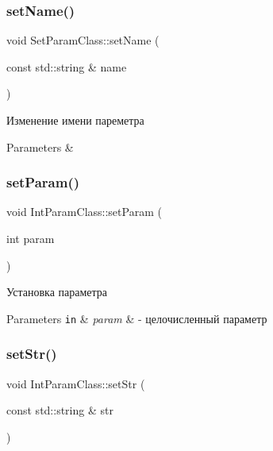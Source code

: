 \subsubsection{\texorpdfstring{set\+Name()}{setName()}}
{\footnotesize\ttfamily void Set\+Param\+Class\+::set\+Name (\begin{DoxyParamCaption}\item[{const std\+::string \&}]{name }\end{DoxyParamCaption})\hspace{0.3cm}{\ttfamily [inherited]}}



Изменение имени пареметра 


\begin{DoxyParams}{Parameters}
{\em } & \\
\hline
\end{DoxyParams}
\mbox{\label{class_int_param_class_a88b39fd564e8061753178471e6a59097}} 
\subsubsection{\texorpdfstring{set\+Param()}{setParam()}}
{\footnotesize\ttfamily void Int\+Param\+Class\+::set\+Param (\begin{DoxyParamCaption}\item[{int}]{param }\end{DoxyParamCaption})}



Установка параметра 


\begin{DoxyParams}[1]{Parameters}
\mbox{\tt in}  & {\em param} & -\/ целочисленный параметр \\
\hline
\end{DoxyParams}
\mbox{\label{class_int_param_class_af7fdd091d24986adef64f708b1d7fc11}} 
\subsubsection{\texorpdfstring{set\+Str()}{setStr()}}
{\footnotesize\ttfamily void Int\+Param\+Class\+::set\+Str (\begin{DoxyParamCaption}\item[{const std\+::string \&}]{str }\end{DoxyParamCaption})\hspace{0.3cm}{\ttfamily [virtual]}}




